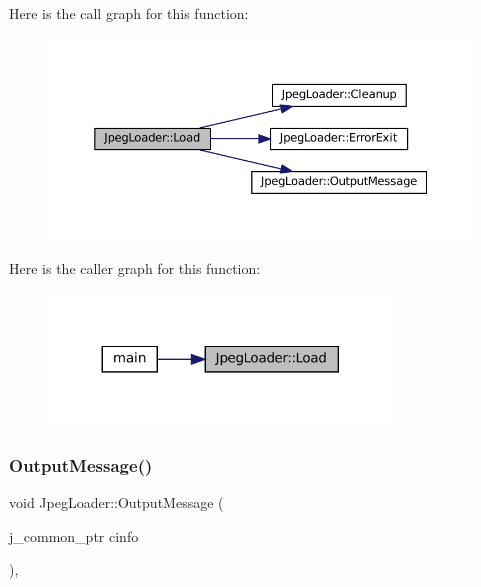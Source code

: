 Here is the call graph for this function\+:
\nopagebreak
\begin{figure}[H]
\begin{center}
\leavevmode
\includegraphics[width=350pt]{classJpegLoader_a094609a59107dfbd1cca84fa2467c926_cgraph}
\end{center}
\end{figure}
Here is the caller graph for this function\+:
\nopagebreak
\begin{figure}[H]
\begin{center}
\leavevmode
\includegraphics[width=257pt]{classJpegLoader_a094609a59107dfbd1cca84fa2467c926_icgraph}
\end{center}
\end{figure}
\mbox{\label{classJpegLoader_ae23a077fd30b90b04edeb13f89b36a3e}} 
\subsubsection{\texorpdfstring{OutputMessage()}{OutputMessage()}}
{\footnotesize\ttfamily void Jpeg\+Loader\+::\+Output\+Message (\begin{DoxyParamCaption}\item[{j\+\_\+common\+\_\+ptr}]{cinfo }\end{DoxyParamCaption})\hspace{0.3cm}{\ttfamily [static]}, {\ttfamily [private]}}



